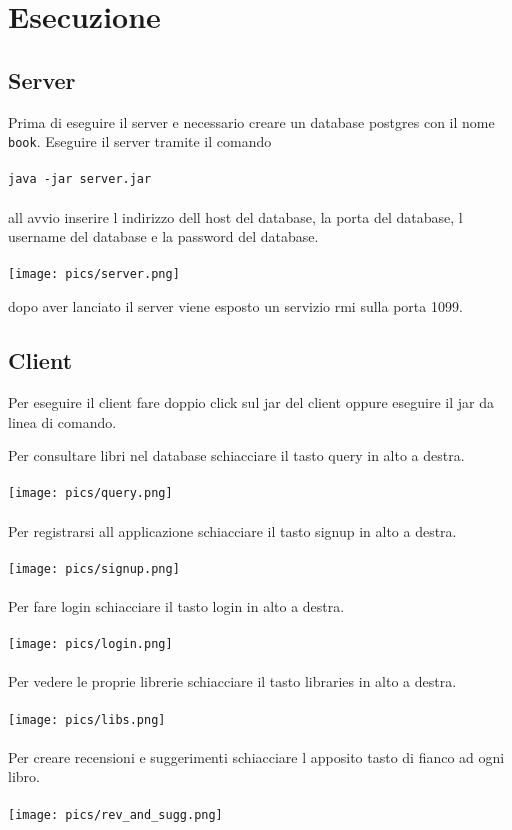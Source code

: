 \documentclass{report}
\begin{document}
\chapter{Esecuzione}
\section{Server}
Prima di eseguire il server e necessario creare un database postgres con il nome \verb+book+. 
Eseguire il server tramite il comando \\ \\ 
\verb+java -jar server.jar+\\ \\
all avvio inserire l indirizzo dell host del database, la porta del database, l username del database e la password del database. \\ \\

\texttt{[image: pics/server.png]}

dopo aver lanciato il server viene esposto un servizio rmi sulla porta 1099.


\section{Client}
Per eseguire il client fare doppio click sul jar del client oppure eseguire il jar da linea di comando.

Per consultare libri nel database schiacciare il tasto query in alto a destra. \\ \\
\texttt{[image: pics/query.png]} \\ \\
Per registrarsi all applicazione schiacciare il tasto signup in alto a destra. \\ \\
\texttt{[image: pics/signup.png]} \\ \\
Per fare login schiacciare il tasto login in alto a destra. \\ \\
\texttt{[image: pics/login.png]} \\ \\
Per vedere le proprie librerie schiacciare il tasto libraries in alto a destra. \\ \\ 
\texttt{[image: pics/libs.png]} \\ \\
Per creare recensioni e suggerimenti schiacciare l apposito tasto di fianco ad ogni libro. \\ \\ 
\texttt{[image: pics/rev\_and\_sugg.png]} \\ \\
\end{document}
